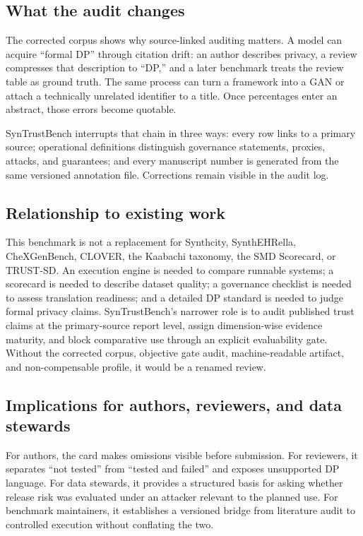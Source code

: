 \documentclass[11pt,letterpaper]{article}
\begin{document}
\subsection{What the audit changes}

The corrected corpus shows why source-linked auditing matters. A model can acquire ``formal DP'' through citation drift: an author describes privacy, a review compresses that description to ``DP,'' and a later benchmark treats the review table as ground truth. The same process can turn a framework into a GAN or attach a technically unrelated identifier to a title. Once percentages enter an abstract, those errors become quotable.

SynTrustBench interrupts that chain in three ways: every row links to a primary source; operational definitions distinguish governance statements, proxies, attacks, and guarantees; and every manuscript number is generated from the same versioned annotation file. Corrections remain visible in the audit log.

\subsection{Relationship to existing work}

This benchmark is not a replacement for Synthcity, SynthEHRella, CheXGenBench, CLOVER, the Kaabachi taxonomy, the SMD Scorecard, or TRUST-SD. An execution engine is needed to compare runnable systems; a scorecard is needed to describe dataset quality; a governance checklist is needed to assess translation readiness; and a detailed DP standard is needed to judge formal privacy claims. SynTrustBench's narrower role is to audit published trust claims at the primary-source report level, assign dimension-wise evidence maturity, and block comparative use through an explicit evaluability gate. Without the corrected corpus, objective gate audit, machine-readable artifact, and non-compensable profile, it would be a renamed review.

\subsection{Implications for authors, reviewers, and data stewards}

For authors, the card makes omissions visible before submission. For reviewers, it separates ``not tested'' from ``tested and failed'' and exposes unsupported DP language. For data stewards, it provides a structured basis for asking whether release risk was evaluated under an attacker relevant to the planned use. For benchmark maintainers, it establishes a versioned bridge from literature audit to controlled execution without conflating the two.
\end{document}
